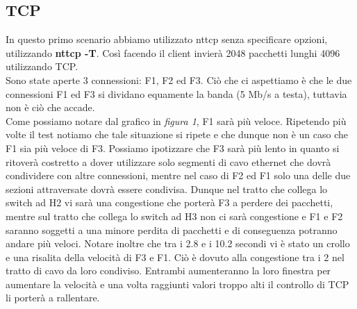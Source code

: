\documentclass[12pt]{article}
\begin{document}
\subsection{TCP}
In questo primo scenario abbiamo utilizzato nttcp senza specificare opzioni, utilizzando \textbf{nttcp -T}.
Così facendo il client invierà 2048 pacchetti lunghi 4096 utilizzando TCP.\\
Sono state aperte 3 connessioni: F1, F2 ed F3.
Ciò che ci aspettiamo è che le due connessioni F1 ed F3 si dividano equamente la banda (5 Mb/s a testa), tuttavia non è ciò che accade.\\
Come possiamo notare dal grafico in \textit{figura 1}, F1 sarà più veloce. Ripetendo più volte il test notiamo che tale situazione si ripete e che dunque non è un caso che F1 sia più veloce di F3. 
Possiamo ipotizzare che F3 sarà più lento in quanto si ritoverà costretto a dover utilizzare solo segmenti di cavo ethernet che dovrà condividere con altre connessioni, mentre nel caso di F2 ed F1 solo una delle due sezioni attraversate dovrà essere condivisa. Dunque nel tratto che collega lo switch ad H2 vi sarà una congestione che porterà F3 a perdere dei pacchetti, mentre sul tratto che collega lo switch ad H3 non ci sarà congestione e F1 e F2 saranno soggetti a una minore perdita di pacchetti e di conseguenza potranno andare più veloci.
Notare inoltre che tra i 2.8 e i 10.2 secondi vi è stato un crollo e una risalita della velocità di F3 e F1. Ciò è dovuto alla congestione tra i 2 nel tratto di cavo da loro condiviso. Entrambi aumenteranno la loro finestra per aumentare la velocità e una volta raggiunti valori troppo alti il controllo di TCP li porterà a rallentare.
\end{document}
